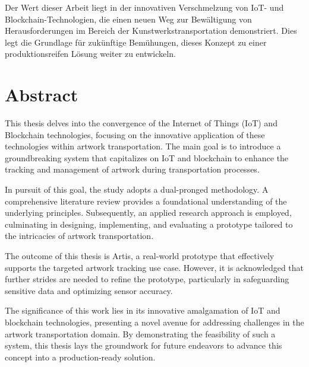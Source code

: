 Der Wert dieser Arbeit liegt in der innovativen Verschmelzung von IoT- und Blockchain-Technologien, die einen neuen Weg zur Bewältigung von Herausforderungen im Bereich der Kunstwerkstransportation demonstriert. Dies legt die Grundlage für zukünftige Bemühungen, dieses Konzept zu einer produktionsreifen Lösung weiter zu entwickeln.


\chapter*{Abstract}
This thesis delves into the convergence of the Internet of Things (IoT) and Blockchain technologies, focusing on the innovative application of these technologies within artwork transportation. The main goal is to introduce a groundbreaking system that capitalizes on IoT and blockchain to enhance the tracking and management of artwork during transportation processes.

In pursuit of this goal, the study adopts a dual-pronged methodology. A comprehensive literature review provides a foundational understanding of the underlying principles. Subsequently, an applied research approach is employed, culminating in designing, implementing, and evaluating a prototype tailored to the intricacies of artwork transportation.

The outcome of this thesis is Artis, a real-world prototype that effectively supports the targeted artwork tracking use case. However, it is acknowledged that further strides are needed to refine the prototype, particularly in safeguarding sensitive data and optimizing sensor accuracy.

The significance of this work lies in its innovative amalgamation of IoT and blockchain technologies, presenting a novel avenue for addressing challenges in the artwork transportation domain. By demonstrating the feasibility of such a system, this thesis lays the groundwork for future endeavors to advance this concept into a production-ready solution.
